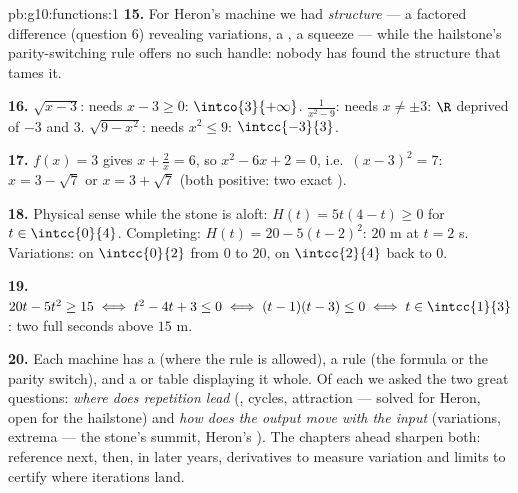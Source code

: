 \begin{solution}{pb:g10:functions:1}
\textbf{15.} For Heron's machine we had \emph{structure} --- a
factored difference (question 6) revealing variations, a
, a squeeze --- while the hailstone's parity-switching
rule offers no such handle: nobody has found the structure that
tames it.

\textbf{16.} $\sqrt{x - 3}$: needs $x - 3 \geq 0$:
$\intco{3}{+\infty}$. $\frac{1}{x^2 - 9}$: needs
$x \neq \pm 3$: $\R$ deprived of $-3$ and $3$.
$\sqrt{9 - x^2}$: needs $x^2 \leq 9$: $\intcc{-3}{3}$.

\textbf{17.} $f(x) = 3$ gives $x + \frac2x = 6$, so
$x^2 - 6x + 2 = 0$, i.e.\ $(x - 3)^2 = 7$:
$x = 3 - \sqrt7$ or $x = 3 + \sqrt7$ (both positive: two exact
).

\textbf{18.} Physical sense while the stone is aloft:
$H(t) = 5t(4 - t) \geq 0$ for $t \in \intcc{0}{4}$. Completing:
$H(t) = 20 - 5(t - 2)^2$:  $20$ m at $t = 2$ s.
Variations:  on $\intcc{0}{2}$ from $0$ to $20$,
 on $\intcc{2}{4}$ back to $0$.

\textbf{19.} $20t - 5t^2 \geq 15 \iff t^2 - 4t + 3 \leq 0 \iff
(t - 1)(t - 3) \leq 0 \iff t \in \intcc{1}{3}$: two full
seconds above $15$ m.

\textbf{20.} Each machine has a  (where the rule is
allowed), a rule (the formula or the parity switch), and a
 or table displaying it whole. Of each we asked the two
great questions: \emph{where does repetition lead} (, cycles, attraction --- solved for Heron, open for the
hailstone) and \emph{how does the output move with the input}
(variations, extrema --- the stone's summit, Heron's ).
The chapters ahead sharpen both: reference  next,
then, in later years, derivatives to measure variation and
limits to certify where iterations land.
\end{solution}
